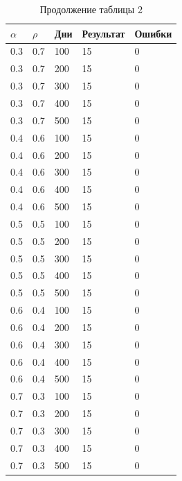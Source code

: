 \begin{center}
\begin{table}[!h]
	\begin{center}
		\begin{flushleft}
			\captionsetup{margin*=125pt}
			\caption*{Продолжение таблицы 2}
		\end{flushleft}
		\begin{tabular}{|l | l | l | l | l | } \hline
			$\alpha$ & $\rho$ & Дни & Результат & Ошибки \\ \hline
						0.3 &  0.7 &  100 &    15 &     0 \\
			0.3 &  0.7 &  200 &    15 &     0 \\
			0.3 &  0.7 &  300 &    15 &     0 \\
			0.3 &  0.7 &  400 &    15 &     0 \\
			0.3 &  0.7 &  500 &    15 &     0 \\
			\hline
			0.4 &  0.6 &  100 &    15 &     0 \\
			0.4 &  0.6 &  200 &    15 &     0 \\
			0.4 &  0.6 &  300 &    15 &     0 \\
			0.4 &  0.6 &  400 &    15 &     0 \\
			0.4 &  0.6 &  500 &    15 &     0 \\
				\hline
						0.5 &  0.5 &  100 &    15 &     0 \\
			0.5 &  0.5 &  200 &    15 &     0 \\
			0.5 &  0.5 &  300 &    15 &     0 \\
			0.5 &  0.5 &  400 &    15 &     0 \\
			0.5 &  0.5 &  500 &    15 &     0 \\
			\hline
			0.6 &  0.4 &  100 &    15 &     0 \\
		0.6 &  0.4 &  200 &    15 &     0 \\
		0.6 &  0.4 &  300 &    15 &     0 \\
		0.6 &  0.4 &  400 &    15 &     0 \\
		0.6 &  0.4 &  500 &    15 &     0 \\
		\hline
		0.7 &  0.3 &  100 &    15 &     0 \\
		0.7 &  0.3 &  200 &    15 &     0 \\
		0.7 &  0.3 &  300 &    15 &     0 \\
		0.7 &  0.3 &  400 &    15 &     0 \\
		0.7 &  0.3 &  500 &    15 &     0 \\
		\hline
		\end{tabular}
	\end{center}
\end{table}
\end{center}

